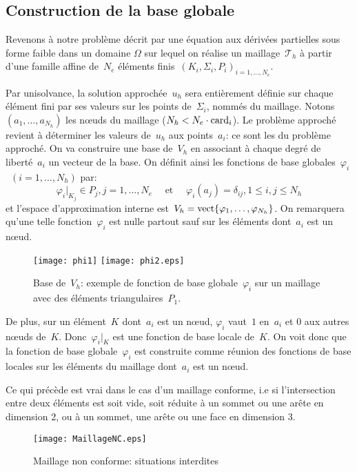 \medskip
\subsection{Construction de la base globale}
Revenons à notre problème décrit par une équation aux dérivées partielles sous forme faible dans un domaine $\Omega$ sur lequel on réalise un maillage~$\mathcal{T}_h$ à partir d'une famille affine de~$N_e$ éléments finis~$(K_i, \Sigma_i, P_i)_{i=1,\ldots,N_e}$.

Par unisolvance, la solution approchée~$u_h$ sera entièrement définie sur chaque élément fini par ses valeurs sur les points de~$\Sigma_i$, nommés  du maillage.
Notons~$(a_1,\ldots, a_{N_h})$ les nœuds du maillage ($N_h<N_e \cdot \mathrm{card}_i$).
Le problème approché revient à déterminer les valeurs de~$u_h$ aux points~$a_i$: ce sont les  du problème approché.
On va construire une base de~$V_h$ en associant à chaque degré de liberté~$a_i$ un vecteur de la base.
On définit ainsi les fonctions de base globales~$\varphi_i$~$(i = 1,\ldots, N_h)$ par:
\begin{equation}\varphi_i|_{K_j} \in P_j, j = 1,\ldots, N_e \quad \text{ et }\quad \varphi_i(a_j) = \delta_{ij}, 1\le i,j\le N_h\end{equation}
et l'espace d'approximation interne est~$V_h=\operatorname{vect}\{\varphi_1,\ldots, \varphi_{N_h}\}$.
On remarquera qu'une telle fonction~$\varphi_i$ est nulle partout sauf sur les éléments
dont~$a_i$ est un nœud.
\begin{figure}[h!]
\centering
\texttt{[image: phi1]} \hspace{5em} \texttt{[image: phi2.eps]}
\caption{\label{BaseVh} Base de~$V_h$: exemple de fonction de base globale~$\varphi_i$ sur un maillage avec des éléments triangulaires~$P_1$.}
\end{figure}

\medskip
De plus, sur un élément~$K$ dont~$a_i$ est un nœud, $\varphi_i$ vaut~$1$ en~$a_i$ et $0$ aux autres nœuds de~$K$. Donc~$\varphi_i|_K$ est une fonction de base locale de~$K$.
On voit donc que la fonction de base globale~$\varphi_i$ est construite comme réunion des fonctions de base locales sur les éléments du maillage dont~$a_i$ est un nœud.

\medskip
\begin{remarque} Ce qui précède est vrai dans le cas d'un maillage conforme, i.e si l'intersection entre deux éléments est soit vide, soit réduite à un sommet ou une arête en dimension 2, ou à un sommet, une arête ou une face en dimension 3.\end{remarque}
\begin{figure}[h!]
\centering
\texttt{[image: MaillageNC.eps]}
\caption{Maillage non conforme: situations interdites}\label{maillageNC}
\end{figure}

